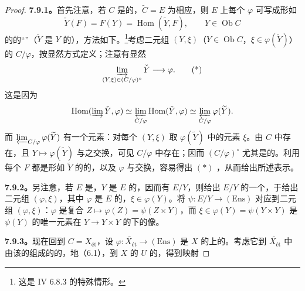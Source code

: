 \begin{proof}
\par\textbf{7.9.1。}首先注意，若 $C$ 是的，$\widetilde C=E$ 为相应，则 $E$ 上每个 $\varphi$ 可写成形如
\[\check Y(F)=F(Y)=\operatorname{Hom}(\widetilde Y,F),\qquad Y\in\operatorname{Ob}C\]
的的“”（$\widetilde Y$ 是 $Y$ 的），方法如下。\footnote{这是 IV 6.8.3 的特殊情形。}考虑二元组 $(Y,\xi)$（$Y\in\operatorname{Ob}C$，$\xi\in\varphi(\widetilde Y)$）的 $C/\varphi$，按显然方式定义；注意有显然
\[\varinjlim_{(Y,\xi)\in(C/\varphi)^\circ}\check Y\longrightarrow\varphi.\tag{*}\]
这是因为
\[\operatorname{Hom}(\varinjlim\check Y,\varphi)\simeq\varprojlim_{C/\varphi}\operatorname{Hom}(\check Y,\varphi)\simeq\varprojlim_{C/\varphi}\varphi(\widetilde Y).\]
而 $\varprojlim_{C/\varphi}\varphi(\widetilde Y)$ 有一个元素：对每个 $(Y,\xi)$ 取 $\varphi(\widetilde Y)$ 中的元素 $\xi$。由 $C$ 中存在，且 $Y\mapsto\varphi(\widetilde Y)$ 与之交换，可见 $C/\varphi$ 中存在；因而 $(C/\varphi)^\circ$ 尤其是的。利用每个 $F$ 都是形如 $\widetilde Y$ 的的，以及 $\varphi$ 与交换，容易得出 $(*)$ ，从而给出所述表示。
\par\textbf{7.9.2。}另注意，若 $E$ 是，$Y$ 是 $E$ 的，因而有 $E/Y$，则给出 $E/Y$ 的一个，于给出二元组 $(\varphi,\xi)$，其中 $\varphi$ 是 $E$ 的，$\xi\in\varphi(Y)$。将 $\psi:E/Y\to(\mathrm{Ens})$ 对应到二元组 $(\varphi,\xi)$：$\varphi$ 是复合 $Z\mapsto\varphi(Z)=\psi(Z\times Y)$，而 $\xi\in\varphi(Y)=\psi(Y\times Y)$ 是 $\psi(Y)$ 的唯一元素在 $Y\to Y\times Y$ 的下的像。
\par\textbf{7.9.3。}现在回到 $C=X_{\text{ét}}$，设 $\varphi:\widetilde{X_{\text{ét}}}\to(\mathrm{Ens})$ 是 $X$ 的上的。考虑它到 $\widetilde{X_{\text{ét}}}$ 中由该的组成的的，地（6.1），到 $X$ 的 $U$ 的，得到映射

\end{proof}
